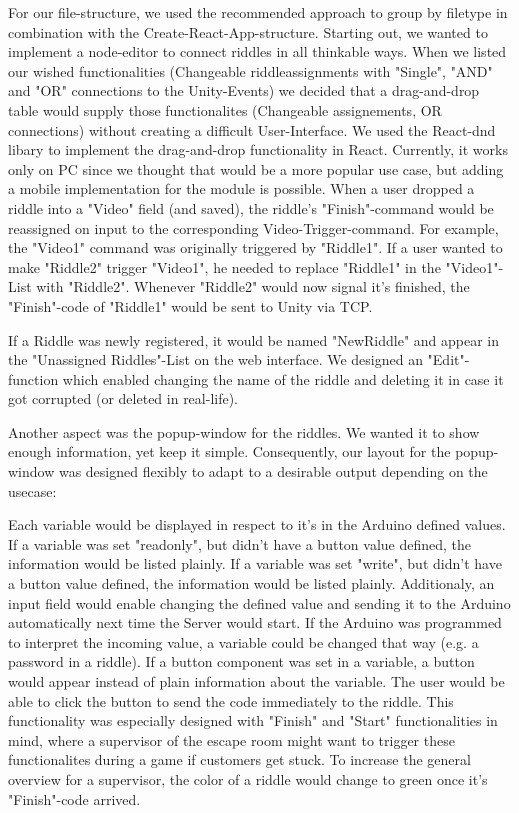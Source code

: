 For our file-structure, we used the recommended approach to group by filetype \parencite{reactStructure} in combination with the Create-React-App-structure.
Starting out, we wanted to implement a node-editor to connect riddles in all thinkable ways. 
When we listed our wished functionalities (Changeable riddleassignments with "Single", "AND" and "OR" connections to the Unity-Events) we decided that a drag-and-drop table would supply those functionalites (Changeable assignements, OR connections) without creating a difficult User-Interface.
We used the React-dnd libary \parencite{reactDND} to implement the drag-and-drop functionality in React. Currently, it works only on PC since we thought that would be a more popular use case, but adding a mobile implementation for the module is possible.
When a user dropped a riddle into a "Video" field (and saved), the riddle's "Finish"-command would be reassigned on input to the corresponding Video-Trigger-command. 
For example, the "Video1" command was originally triggered by "Riddle1". 
If a user wanted to make "Riddle2" trigger "Video1", he needed to replace "Riddle1" in the "Video1"-List with "Riddle2". 
Whenever "Riddle2" would now signal it's finished, the "Finish"-code of "Riddle1" would be sent to Unity via TCP.

If a Riddle was newly registered, it would be named "NewRiddle" and appear in the "Unassigned Riddles"-List on the web interface.
We designed an "Edit"-function which enabled changing the name of the riddle and deleting it in case it got corrupted (or deleted in real-life).

Another aspect was the popup-window for the riddles. We wanted it to show enough information, yet keep it simple. 
Consequently, our layout for the popup-window was designed flexibly to adapt to a desirable output depending on the usecase:

Each variable would be displayed in respect to it's in the Arduino defined values. 
If a variable was set "readonly", but didn't have a button value defined, the information would be listed plainly.
If a variable was set "write", but didn't have a button value defined, the information would be listed plainly. 
Additionaly, an input field would enable changing the defined value and sending it to the Arduino automatically next time the Server would start. 
If the Arduino was programmed to interpret the incoming value, a variable could be changed that way (e.g. a password in a riddle).
If a button component was set in a variable, a button would appear instead of plain information about the variable. 
The user would be able to click the button to send the code immediately to the riddle. 
This functionality was especially designed with "Finish" and "Start" functionalities in mind, where a supervisor of the escape room might want to trigger these functionalites during a game if customers get stuck.
To increase the general overview for a supervisor, the color of a riddle would change to green once it's "Finish"-code arrived.

